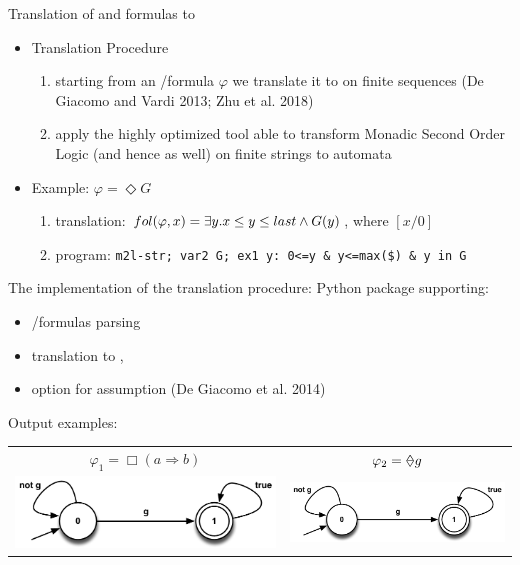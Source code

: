 \documentclass{beamer}
\begin{document}
\begin{frame}{Translation of \LTLf and \PLTL formulas to \DFA}
	\begin{itemize}
		\item Translation Procedure
		\begin{enumerate}
		\item starting from an \LTLf/\PLTL formula $\varphi$ we translate it to \FOL on finite sequences (De Giacomo and Vardi 2013; Zhu et al. 2018)
		\item apply the highly optimized tool \MONA able to transform Monadic Second Order Logic (and hence \FOL as well) on finite strings to \DFA automata		
		\end{enumerate}
	\end{itemize}
	
	\begin{itemize}
	\item Example: $\varphi = \Diamond G$
	\begin{enumerate}
	\item \FOL translation: $fol(\varphi, x) = \exists y. x \leq y \leq last \wedge G(y)$, where $[x/0]$
	\item \MONA program: \texttt{m2l-str; var2 G; ex1 y: 0<=y \& y<=max(\$) \& y in G}
	\end{enumerate}
	\end{itemize}
\end{frame}

\begin{frame}{The implementation of the translation procedure: \LTLfToDFA}
Python package supporting:
	\begin{itemize}
		\item \LTLf/\PLTL formulas parsing
		\item translation to \FOL, \DFA
		\item option for \declare assumption (De Giacomo et al. 2014)
	\end{itemize}
	Output examples:
\begin{table}
	\centering
\begin{tabular}{c c} 
	$\varphi_1 = \Box(a \Rightarrow b)$ & $\varphi_2 = \Once g$\\
    \includegraphics[width=.5\textwidth]{../images/future-pres} & \includegraphics[width=.5\textwidth]{../images/future-pres}\\
\end{tabular}\\
\end{table}

\end{frame}
\end{document}
